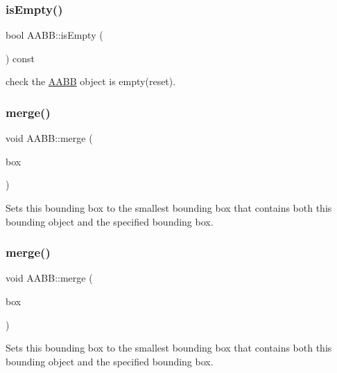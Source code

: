 \subsubsection{\texorpdfstring{is\+Empty()}{isEmpty()}\hspace{0.1cm}{\footnotesize\ttfamily [2/2]}}
{\footnotesize\ttfamily bool A\+A\+B\+B\+::is\+Empty (\begin{DoxyParamCaption}{ }\end{DoxyParamCaption}) const}

check the \hyperlink{classAABB}{A\+A\+BB} object is empty(reset). \mbox{\label{classAABB_ad629f50f834164e7a4d451268798db5a}} 
\subsubsection{\texorpdfstring{merge()}{merge()}\hspace{0.1cm}{\footnotesize\ttfamily [1/2]}}
{\footnotesize\ttfamily void A\+A\+B\+B\+::merge (\begin{DoxyParamCaption}\item[{const \hyperlink{classAABB}{A\+A\+BB} \&}]{box }\end{DoxyParamCaption})}

Sets this bounding box to the smallest bounding box that contains both this bounding object and the specified bounding box. \mbox{\label{classAABB_ad629f50f834164e7a4d451268798db5a}} 
\subsubsection{\texorpdfstring{merge()}{merge()}\hspace{0.1cm}{\footnotesize\ttfamily [2/2]}}
{\footnotesize\ttfamily void A\+A\+B\+B\+::merge (\begin{DoxyParamCaption}\item[{const \hyperlink{classAABB}{A\+A\+BB} \&}]{box }\end{DoxyParamCaption})}

Sets this bounding box to the smallest bounding box that contains both this bounding object and the specified bounding box. \mbox{\label{classAABB_a5cbdbeaef02a2a748105c940c49bba74}} 
